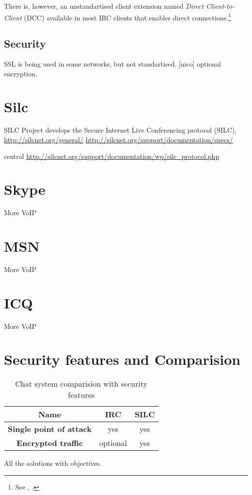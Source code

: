 There is, however, an unstandartised client extension named 
\textit{Direct Client-to-Client} (DCC) available in most IRC clients
that enables direct connections.\footnote{See \cite{dcc}, \cite{dcc2}.}

\subsection{Security}
SSL is being used in some networks, but not standartised. [nico]
optional encryption.
\section{Silc}
SILC Project develops the Secure Internet Live Conferencing protocol (SILC),
\url{http://silcnet.org/general/}
\url{http://silcnet.org/support/documentation/specs/}

central
\url{http://silcnet.org/support/documentation/wp/silc_protocol.php}


\section{Skype}
More VoIP
\section{MSN}
More VoIP
\section{ICQ}
More VoIP


\section{Security features and Comparision}

\begin{longtable}{|c|c|c|}
\caption{Chat system comparision with security features}\\
\hline
\textbf{Name} & \textbf{IRC} & \textbf{SILC}\\
\hline
\textbf{Single point of attack} & yes & yes\\
\hline
\textbf{Encrypted traffic} & optional & yes\\
\hline
\end{longtable}

All the solutions with objectives.
